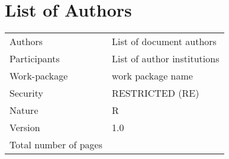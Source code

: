 

\chapter*{List of Authors}

{
  \footnotesize
    \centering
    \begin{tabular}{|l|p{}|}
      \hline
      Authors      &  List of document authors  \\ 
      Participants &  List of author institutions  \\
      Work-package & work package name\\
      Security & RESTRICTED (RE)\\
      Nature & R \\
      Version &  1.0 \\
      Total number of pages & \pageref{LastPage} \\
      \hline
    \end{tabular}
}  

